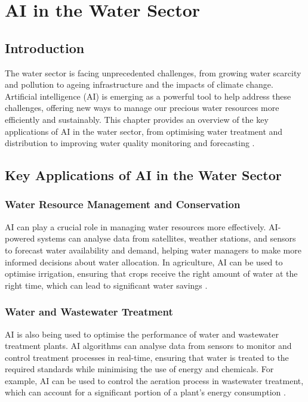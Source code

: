 \chapter{AI in the Water Sector}
\label{cha:ai_in_the_water_sector}

\section{Introduction}

The water sector is facing unprecedented challenges, from growing water scarcity and pollution to ageing infrastructure and the impacts of climate change. Artificial intelligence (AI) is emerging as a powerful tool to help address these challenges, offering new ways to manage our precious water resources more efficiently and sustainably. This chapter provides an overview of the key applications of AI in the water sector, from optimising water treatment and distribution to improving water quality monitoring and forecasting \parencite{hussain2024artificial}.

\section{Key Applications of AI in the Water Sector}

\subsection{Water Resource Management and Conservation}

AI can play a crucial role in managing water resources more effectively. AI-powered systems can analyse data from satellites, weather stations, and sensors to forecast water availability and demand, helping water managers to make more informed decisions about water allocation. In agriculture, AI can be used to optimise irrigation, ensuring that crops receive the right amount of water at the right time, which can lead to significant water savings \parencite{goyal2020review}.

\subsection{Water and Wastewater Treatment}

AI is also being used to optimise the performance of water and wastewater treatment plants. AI algorithms can analyse data from sensors to monitor and control treatment processes in real-time, ensuring that water is treated to the required standards while minimising the use of energy and chemicals. For example, AI can be used to control the aeration process in wastewater treatment, which can account for a significant portion of a plant's energy consumption \parencite{satoh2023can}.

